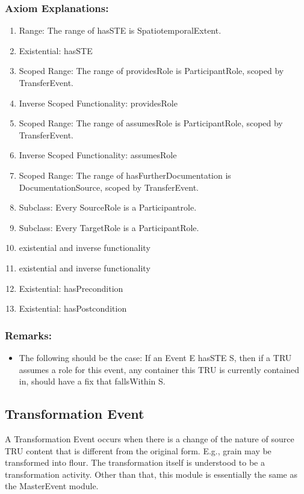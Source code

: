 \subsubsection*{Axiom Explanations:}
\begin{enumerate}
    \item Range: The range of \textsf{hasSTE} is \textsf{SpatiotemporalExtent}.
    \item Existential: \textsf{hasSTE}
    \item Scoped Range: The range of \textsf{providesRole} is \textsf{ParticipantRole}, scoped by \textsf{TransferEvent}.
    \item Inverse Scoped Functionality: \textsf{providesRole}
    \item Scoped Range: The range of \textsf{assumesRole} is \textsf{ParticipantRole}, scoped by \textsf{TransferEvent}.
    \item Inverse Scoped Functionality: \textsf{assumesRole}
    \item Scoped Range: The range of \textsf{hasFurtherDocumentation} is \textsf{DocumentationSource}, scoped by \textsf{TransferEvent}.
    \item Subclass: Every \textsf{SourceRole} is a \textsf{Participantrole}.
    \item Subclass: Every \textsf{TargetRole} is a \textsf{ParticipantRole}.
    \item existential and inverse functionality
    \item existential and inverse functionality
    \item Existential: \textsf{hasPrecondition}
    \item Existential: \textsf{hasPostcondition}
\end{enumerate}

\subsubsection{Remarks:}
\begin{itemize}
    \item The following should be the case: If an Event E hasSTE S, then if a TRU assumes a role for this event, any container this TRU is currently contained in, should have a fix that fallsWithin S.
\end{itemize}

\subsection{Transformation Event}
\label{ssec:transformation}
A Transformation Event occurs when there is a change of the nature of source TRU content that is different from the original form. E.g., grain may be transformed into flour. The transformation itself is understood to be a transformation activity. Other than that, this module is essentially the same as the MasterEvent module.

